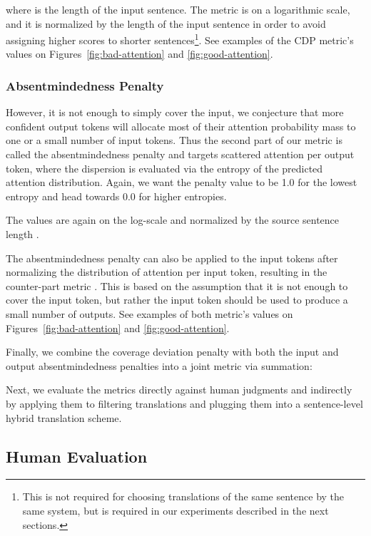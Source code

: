 \documentclass[]{article}
\begin{document}
where  is the length of the input sentence. The metric is on a logarithmic scale, and it is normalized by the length of the input sentence in order to avoid assigning higher scores to shorter sentences\footnote{This is not required for choosing translations of the same sentence by the same system, but is required in our experiments described in the next sections.}. See examples of the CDP metric's values on Figures~\ref{fig:bad-attention} and \ref{fig:good-attention}.



\subsubsection*{Absentmindedness Penalty}

However, it is not enough to simply cover the input, we conjecture that more confident output tokens will allocate most of their attention probability mass to one or a small number of input tokens. Thus the second part of our metric is called the absentmindedness penalty and targets scattered attention per output token, where the dispersion is evaluated via the entropy of the predicted attention distribution. Again, we want the penalty value to be 1.0 for the lowest entropy and head towards 0.0 for higher entropies.

The values are again on the log-scale and normalized by the source sentence length .

The absentmindedness penalty can also be applied to the input tokens after normalizing the distribution of attention per input token, resulting in the counter-part metric . This is based on the assumption that it is not enough to cover the input token, but rather the input token should be used to produce a small number of outputs. See examples of both metric's values on Figures~\ref{fig:bad-attention} and \ref{fig:good-attention}.

Finally, we combine the coverage deviation penalty with both the input and output absentmindedness penalties into a joint metric via summation:


Next, we evaluate the metrics directly against human judgments and indirectly by applying them to filtering translations and plugging them into a sentence-level hybrid translation scheme.

\subsection{Human Evaluation}
\end{document}
